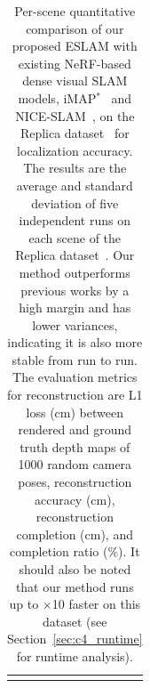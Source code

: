 \begin{table}[t]
\begin{center}
\begin{tabular}{l|l|cccc}
            \Xhline{2\arrayrulewidth}
            \end{tabular}
    \end{center}
    \caption{Per-scene quantitative comparison of our proposed ESLAM with existing NeRF-based dense visual SLAM models, iMAP$^{*}$~\citep{sucar2021imap} and NICE-SLAM~\citep{zhu2022nice}, on the Replica dataset~\citep{replica19arxiv} for localization accuracy. The results are the average and standard deviation of five independent runs on each scene of the Replica dataset~\citep{replica19arxiv}. Our method outperforms previous works by a high margin and has lower variances, indicating it is also more stable from run to run. The evaluation metrics for reconstruction are L1 loss (cm) between rendered and ground truth depth maps of 1000 random camera poses, reconstruction accuracy (cm), reconstruction completion (cm), and completion ratio (\%). It should also be noted that our method runs up to $\times$10 faster on this dataset (see Section~\ref{sec:c4_runtime} for runtime analysis).}
    \label{table:per_scene_reconstruction}
\end{table}

